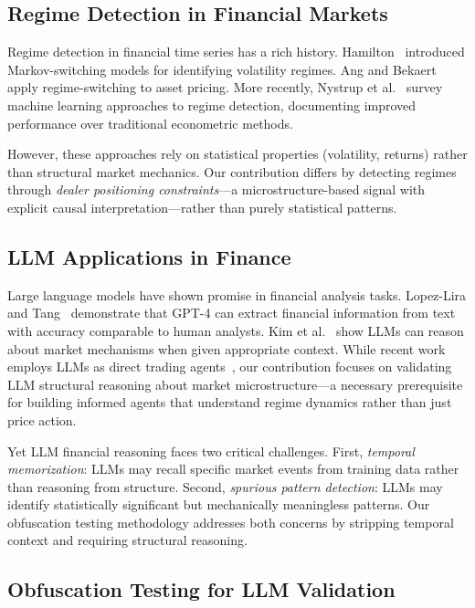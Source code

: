 \subsection{Regime Detection in Financial Markets}

Regime detection in financial time series has a rich history. Hamilton~\citep{hamilton1989new} introduced Markov-switching models for identifying volatility regimes. Ang and Bekaert~\citep{ang2002regime} apply regime-switching to asset pricing. More recently, Nystrup et al.~\citep{nystrup2020regime} survey machine learning approaches to regime detection, documenting improved performance over traditional econometric methods.

However, these approaches rely on statistical properties (volatility, returns) rather than structural market mechanics. Our contribution differs by detecting regimes through \textit{dealer positioning constraints}---a microstructure-based signal with explicit causal interpretation---rather than purely statistical patterns.

\subsection{LLM Applications in Finance}

Large language models have shown promise in financial analysis tasks. Lopez-Lira and Tang~\citep{lopez2023can} demonstrate that GPT-4 can extract financial information from text with accuracy comparable to human analysts. Kim et al.~\citep{kim2024financial} show LLMs can reason about market mechanisms when given appropriate context. While recent work employs LLMs as direct trading agents~\citep{yang2024tradingagents}, our contribution focuses on validating LLM structural reasoning about market microstructure---a necessary prerequisite for building informed agents that understand regime dynamics rather than just price action.

Yet LLM financial reasoning faces two critical challenges. First, \textit{temporal memorization}: LLMs may recall specific market events from training data rather than reasoning from structure. Second, \textit{spurious pattern detection}: LLMs may identify statistically significant but mechanically meaningless patterns. Our obfuscation testing methodology addresses both concerns by stripping temporal context and requiring structural reasoning.

\subsection{Obfuscation Testing for LLM Validation}

